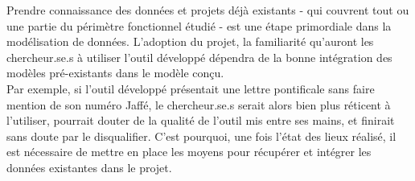 Prendre connaissance des données et projets déjà existants -  qui couvrent tout ou une partie du périmètre fonctionnel étudié - est une étape primordiale dans la modélisation de données. L’adoption du projet, la familiarité qu’auront les chercheur.se.s à utiliser l’outil développé dépendra de la bonne intégration des modèles pré-existants dans le modèle conçu.\\
Par exemple, si l’outil développé présentait une lettre pontificale sans faire mention de son numéro Jaffé, le chercheur.se.s serait alors bien plus réticent à l’utiliser, pourrait douter de la qualité de l’outil mis entre ses mains, et finirait sans doute par le disqualifier.
C’est pourquoi, une fois l’état des lieux réalisé, il est nécessaire de mettre en place les moyens pour récupérer et intégrer les données existantes dans le projet.


